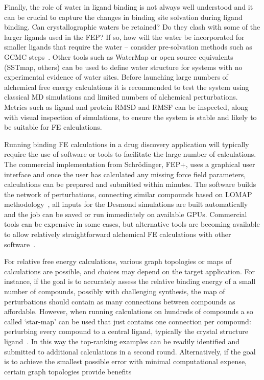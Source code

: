 \documentclass[9pt,bestpractices]{livecoms}
\begin{document}
Finally, the role of water in ligand binding is not always well understood and it can be crucial to capture the changes in binding site solvation during ligand binding. Can crystallographic waters be retained? Do they clash with some of the larger ligands used in the FEP? If so, how will the water be incorporated for smaller ligands that require the water – consider pre-solvation methods such as GCMC steps~\cite{michel2010prediction}. Other tools such as WaterMap or open source equivalents (SSTmap, others) can be used to define water structure for systems with no experimental evidence of water sites. Before launching large numbers of alchemical free energy calculations it is recommended to test the system using classical MD simulations and limited numbers of alchemical perturbations. Metrics such as ligand and protein RMSD and RMSF can be inspected, along with visual inspection of simulations, to ensure the system is stable and likely to be suitable for FE calculations. 

Running binding FE calculations in a drug discovery application will typically require the use of software or tools to facilitate the large number of calculations. The commercial implementation from Schr\"{o}dinger, FEP+, uses a graphical user interface and once the user has calculated any missing force field parameters, calculations can be prepared and submitted within minutes. The software builds the network of perturbations, connecting similar compounds based on LOMAP methodology~\cite{liu2013lead}, all inputs for the Desmond simulations are built automatically and the job can be saved or run immediately on available GPUs. Commercial tools can be expensive in some cases, but alternative tools are becoming available to allow relatively straightforward alchemical FE calculations with other software~\cite{gapsys2015pmx, loeffler2015fesetup, song2019using, gapsys2020large,  jespers2019qligfep}.

For relative free energy calculations, various graph topologies or maps of calculations are possible, and choices may depend on the target application. For instance, if the goal is to accurately assess the relative binding energy of a small number of compounds, possibly with challenging synthesis, the map of perturbations should contain as many connections between compounds as affordable. However, when running calculations on hundreds of compounds a so called ‘star-map’ can be used that just contains one connection per compound: perturbing every compound to a central ligand, typically the crystal structure ligand~\cite{konze2019reactionbased}. In this way the top-ranking examples can be readily identified and submitted to additional calculations in a second round. Alternatively, if the goal is to achieve the smallest possible error with minimal computational expense, certain graph topologies provide benefits~\cite{https://doi.org/10.1002/jcc.26095, https://doi.org/10.1021/acs.jcim.9b00528}
\end{document}

